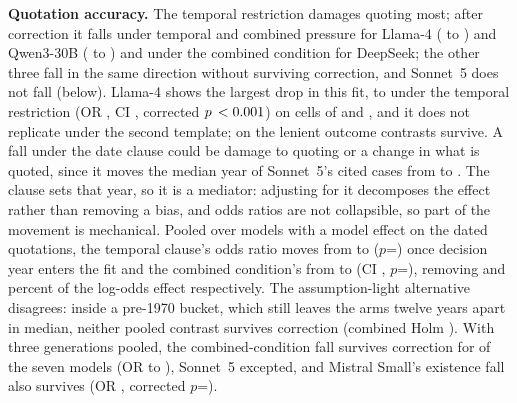 \documentclass{IOS-Book-Article}
\begin{document}
\textbf{Quotation accuracy.} The temporal restriction damages quoting most; after correction it falls under temporal and combined pressure for Llama-4 (\strictLlamaBase{} to \strictLlamaCombo) and Qwen3-30B (\strictQwenBase{} to \strictQwenCombo) and under the combined condition for DeepSeek; the other three fall in the same direction without surviving correction, and Sonnet~5 does not fall (below). Llama-4 shows the largest drop in this fit, \strictLlamaBase{} to \strictLlamaTemporal{} under the temporal restriction (OR \orQuoteLlamaTemporal, CI \ciQuoteLlamaTemporal, corrected $p\,<0.001$) on cells of \scoredLlamaBase{} and \scoredLlamaTemporal, and it does not replicate under the second template; on the lenient outcome \lenSurv{} contrasts survive. A fall under the date clause could be damage to quoting or a change in what is quoted, since it moves the median year of Sonnet~5's cited cases from \sonnetYearBase{} to \sonnetYearCombo. The clause sets that year, so it is a mediator: adjusting for it decomposes the effect rather than removing a bias, and odds ratios are not collapsible, so part of the movement is mechanical. Pooled over models with a model effect on the \yrN{} dated quotations, the temporal clause's odds ratio moves from \yrUnadjOrTemporal{} to \yrAdjOrTemporal{} ($p$=\yrAdjPTemporal) once decision year enters the fit and the combined condition's from \yrUnadjOrCombo{} to \yrAdjOrCombo{} (CI \yrAdjCiCombo, $p$=\yrAdjPCombo), removing \yrShrinkTemporal{} and \yrShrinkCombo{} percent of the log-odds effect respectively. The assumption-light alternative disagrees: inside a pre-1970 bucket, which still leaves the arms twelve years apart in median, neither pooled contrast survives correction (combined Holm \stratHolmCombo). With three generations pooled, the combined-condition fall survives correction for \runsQuoteSurvivors{} of the seven models (OR \runsQuoteOrMin{} to \runsQuoteOrMax), Sonnet~5 excepted, and Mistral Small's existence fall also survives (OR \runsOrCiteMistral, corrected $p$=\runsHolmCiteMistral).
\end{document}
